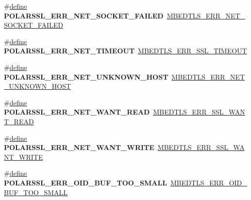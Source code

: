 \begin{DoxyCompactItemize}
\item 
\mbox{\label{compat-1_83_8h_aec186e276d741e5aad9d8b4cd7ab0efd}} 
\#\hyperlink{structdefine}{define} {\bfseries P\+O\+L\+A\+R\+S\+S\+L\+\_\+\+E\+R\+R\+\_\+\+N\+E\+T\+\_\+\+S\+O\+C\+K\+E\+T\+\_\+\+F\+A\+I\+L\+ED}~\hyperlink{net__sockets_8h_aa639b33eeaf6414c0de66ab9b8ff6cde}{M\+B\+E\+D\+T\+L\+S\+\_\+\+E\+R\+R\+\_\+\+N\+E\+T\+\_\+\+S\+O\+C\+K\+E\+T\+\_\+\+F\+A\+I\+L\+ED}
\item 
\mbox{\label{compat-1_83_8h_af7297aa36523ada16a82660bdbd1b258}} 
\#\hyperlink{structdefine}{define} {\bfseries P\+O\+L\+A\+R\+S\+S\+L\+\_\+\+E\+R\+R\+\_\+\+N\+E\+T\+\_\+\+T\+I\+M\+E\+O\+UT}~\hyperlink{ssl_8h_a2fdb240812860402a1a946eae8264148}{M\+B\+E\+D\+T\+L\+S\+\_\+\+E\+R\+R\+\_\+\+S\+S\+L\+\_\+\+T\+I\+M\+E\+O\+UT}
\item 
\mbox{\label{compat-1_83_8h_a8b8dc4d3104b157a2ade8da7831f48f1}} 
\#\hyperlink{structdefine}{define} {\bfseries P\+O\+L\+A\+R\+S\+S\+L\+\_\+\+E\+R\+R\+\_\+\+N\+E\+T\+\_\+\+U\+N\+K\+N\+O\+W\+N\+\_\+\+H\+O\+ST}~\hyperlink{net__sockets_8h_a937d55e9aa02f1554a43f562a5fc24f9}{M\+B\+E\+D\+T\+L\+S\+\_\+\+E\+R\+R\+\_\+\+N\+E\+T\+\_\+\+U\+N\+K\+N\+O\+W\+N\+\_\+\+H\+O\+ST}
\item 
\mbox{\label{compat-1_83_8h_a5f74d0f93745d7b4a7d46a6b78c0fb4a}} 
\#\hyperlink{structdefine}{define} {\bfseries P\+O\+L\+A\+R\+S\+S\+L\+\_\+\+E\+R\+R\+\_\+\+N\+E\+T\+\_\+\+W\+A\+N\+T\+\_\+\+R\+E\+AD}~\hyperlink{ssl_8h_a67a1e093cf042831aa60bb567915b560}{M\+B\+E\+D\+T\+L\+S\+\_\+\+E\+R\+R\+\_\+\+S\+S\+L\+\_\+\+W\+A\+N\+T\+\_\+\+R\+E\+AD}
\item 
\mbox{\label{compat-1_83_8h_a714269000de1543b4f4a3e8d6622a979}} 
\#\hyperlink{structdefine}{define} {\bfseries P\+O\+L\+A\+R\+S\+S\+L\+\_\+\+E\+R\+R\+\_\+\+N\+E\+T\+\_\+\+W\+A\+N\+T\+\_\+\+W\+R\+I\+TE}~\hyperlink{ssl_8h_a674bde213fbbf602e04bbc131dd2dc33}{M\+B\+E\+D\+T\+L\+S\+\_\+\+E\+R\+R\+\_\+\+S\+S\+L\+\_\+\+W\+A\+N\+T\+\_\+\+W\+R\+I\+TE}
\item 
\mbox{\label{compat-1_83_8h_ae3b03c046cf81804af99f84472d0198d}} 
\#\hyperlink{structdefine}{define} {\bfseries P\+O\+L\+A\+R\+S\+S\+L\+\_\+\+E\+R\+R\+\_\+\+O\+I\+D\+\_\+\+B\+U\+F\+\_\+\+T\+O\+O\+\_\+\+S\+M\+A\+LL}~\hyperlink{oid_8h_a27d099496daecdd521df484630694270}{M\+B\+E\+D\+T\+L\+S\+\_\+\+E\+R\+R\+\_\+\+O\+I\+D\+\_\+\+B\+U\+F\+\_\+\+T\+O\+O\+\_\+\+S\+M\+A\+LL}

\end{DoxyCompactItemize}
